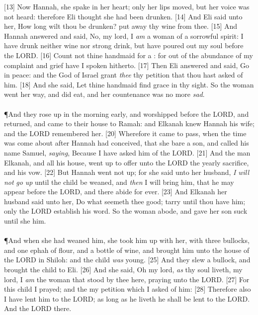 [13] \textcolor[cmyk]{0.99998,1,0,0}{Now Hannah, she spake in her heart; only her lips moved, but her voice was not heard: therefore Eli thought she had been drunken.}
[14] \textcolor[cmyk]{0.99998,1,0,0}{And Eli said unto her, How long wilt thou be drunken? put away thy wine from thee.}
[15] \textcolor[cmyk]{0.99998,1,0,0}{And Hannah answered and said, No, my lord, I \emph{am} a woman of a sorrowful spirit: I have drunk neither wine nor strong drink, but have poured out my soul before the LORD.}
[16] \textcolor[cmyk]{0.99998,1,0,0}{Count not thine handmaid for a : for out of the abundance of my complaint and grief have I spoken hitherto.}
[17] \textcolor[cmyk]{0.99998,1,0,0}{Then Eli answered and said, Go in peace: and the God of Israel grant \emph{thee} thy petition that thou hast asked of him.}
[18] \textcolor[cmyk]{0.99998,1,0,0}{And she said, Let thine handmaid find grace in thy sight. So the woman went her way, and did eat, and her countenance was no more \emph{sad}.}\\
\\
\P \textcolor[cmyk]{0.99998,1,0,0}{And they rose up in the morning early, and worshipped before the LORD, and returned, and came to their house to Ramah: and Elkanah knew Hannah his wife; and the LORD remembered her.}
[20] \textcolor[cmyk]{0.99998,1,0,0}{Wherefore it came to pass, when the time was come about after Hannah had conceived, that she bare a son, and called his name Samuel, \emph{saying}, Because I have asked him of the LORD.}
[21] \textcolor[cmyk]{0.99998,1,0,0}{And the man Elkanah, and all his house, went up to offer unto the LORD the yearly sacrifice, and his vow.}
[22] \textcolor[cmyk]{0.99998,1,0,0}{But Hannah went not up; for she said unto her husband, \emph{I} \emph{will} \emph{not} \emph{go} \emph{up} until the child be weaned, and \emph{then} I will bring him, that he may appear before the LORD, and there abide for ever.}
[23] \textcolor[cmyk]{0.99998,1,0,0}{And Elkanah her husband said unto her, Do what seemeth thee good; tarry until thou have  him; only the LORD establish his word. So the woman abode, and gave her son suck until she  him.}\\
\\
\P \textcolor[cmyk]{0.99998,1,0,0}{And when she had weaned him, she took him up with her, with three bullocks, and one ephah of flour, and a bottle of wine, and brought him unto the house of the LORD in Shiloh: and the child \emph{was} young.}
[25] \textcolor[cmyk]{0.99998,1,0,0}{And they slew a bullock, and brought the child to Eli.}
[26] \textcolor[cmyk]{0.99998,1,0,0}{And she said, Oh my lord, \emph{as} thy soul liveth, my lord, I \emph{am} the woman that stood by thee here, praying unto the LORD.}
[27] \textcolor[cmyk]{0.99998,1,0,0}{For this child I prayed; and the  my petition which I asked of him:}
[28] \textcolor[cmyk]{0.99998,1,0,0}{Therefore also I have lent him to the LORD; as long as he liveth he shall be lent to the LORD. And  the LORD there.}